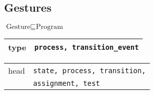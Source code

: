 \documentclass[10pt, a4paper]{article}
\begin{document}
\subsection{Gestures}


\noindent

$\mbox{Gesture} \sqsubseteq \mbox{Program}$



\begin{table}[H]
\def\baselinestretch{1}
{\small
\begin{tabular}{|l|l|}
\hline
{\sc type} & {\tt process, transition\_event} \\
\hline
\end{tabular}
} 
\def\baselinestretch{1.9}
\end{table}

\begin{table}[H]
\def\baselinestretch{1}
{\small
\begin{tabular}{|l|l|}
\hline
{\sc head} & {\tt state, process, transition,} \\
& {\tt assignment, test} \\
\hline
\end{tabular}
} 
\def\baselinestretch{1.9}
\end{table}
\end{document}
